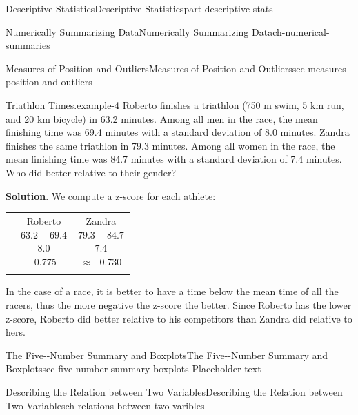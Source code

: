 \documentclass[oneside,10pt,]{book}
\numberwithin{equation}{section}
\newcommand{\hrulethin}  {\noalign{\hrule height 0.04em}}
\newcommand{\hrulethick} {\noalign{\hrule height 0.11em}}
\begin{document}
\begin{partptx}{Descriptive Statistics}{}{Descriptive Statistics}{}{}{part-descriptive-stats}
\begin{chapterptx}{Numerically Summarizing Data}{}{Numerically Summarizing Data}{}{}{ch-numerical-summaries}
\begin{sectionptx}{Measures of Position and Outliers}{}{Measures of Position and Outliers}{}{}{sec-measures-position-and-outliers}
\begin{example}{Triathlon Times.}{example-4}
Roberto finishes a triathlon (750 m swim, 5 km run, and 20 km bicycle) in 63.2 minutes. Among all men in the race, the mean finishing time was 69.4 minutes with a standard deviation of 8.0 minutes. Zandra finishes the same triathlon in 79.3 minutes. Among all women in the race, the mean finishing time was 84.7 minutes with a standard deviation of 7.4 minutes. Who did better relative to their gender?%
\par\smallskip%
\noindent\textbf{Solution}.\hypertarget{solution-11}{}\quad%
\hypertarget{p-108}{}%
We compute a z-score for each athlete:%
\begin{tabular}{lll}\hrulethick
\multicolumn{1}{r}{statistic}&\multicolumn{1}{c}{Roberto}&\multicolumn{1}{c}{Zandra}\tabularnewline\hrulethin
\multicolumn{1}{r}{z-score}&\multicolumn{1}{c}{\(\dfrac{63.2-69.4}{8.0}\)}&\multicolumn{1}{c}{\(\dfrac{79.3-84.7}{7.4}\)}\tabularnewline\hrulethin
\multicolumn{1}{r}{z-score}&\multicolumn{1}{c}{-0.775}&\multicolumn{1}{c}{\(\approx\) -0.730}\tabularnewline\hrulethick
\end{tabular}
\hypertarget{p-109}{}%
In the case of a race, it is better to have a time below the mean time of all the racers, thus the more negative the z-score the better. Since Roberto has the lower z-score, Roberto did better relative to his competitors than Zandra did relative to hers.%
\end{example}
\end{sectionptx}
%
%
\typeout{************************************************}
\typeout{************************************************}
%
\begin{sectionptx}{The Five-{}-{}Number Summary and Boxplots}{}{The Five-{}-{}Number Summary and Boxplots}{}{}{sec-five-number-summary-boxplots}
\hypertarget{p-110}{}%
Placeholder text%
\end{sectionptx}
\end{chapterptx}
%
\typeout{************************************************}
\typeout{************************************************}
%
\begin{chapterptx}{Describing the Relation between Two Variables}{}{Describing the Relation between Two Variables}{}{}{ch-relations-between-two-varibles}
\end{chapterptx}
\end{partptx}
%
%
\typeout{************************************************}
\end{document}
